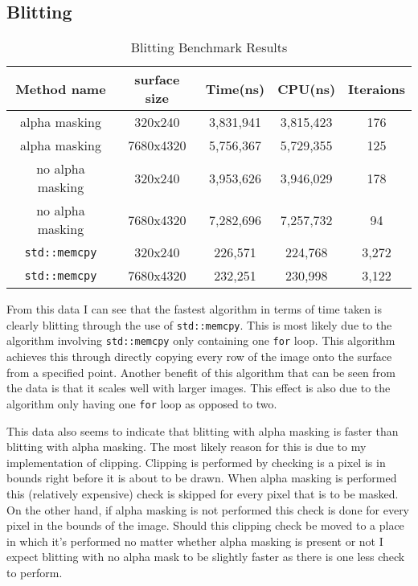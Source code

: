 \documentclass[
	a4paper, %
	10pt, %
]{CSUniSchoolLabReport}
\begin{document}
\subsection{Blitting}
\begin{table}[ht]
	\caption{Blitting Benchmark Results} %
	\centering 
	\begin{tabular}{c c c c c} 
	\hline
	Method name & surface size & Time(ns) & CPU(ns) & Iteraions \\ [0.5ex] 
	\hline
	alpha masking & 320x240 & 3,831,941 & 3,815,423 & 176 \\ 
	alpha masking & 7680x4320 & 5,756,367 & 5,729,355 & 125 \\
	no alpha masking & 320x240 & 3,953,626 & 3,946,029 & 178 \\
	no alpha masking & 7680x4320 & 7,282,696 & 7,257,732 & 94 \\
	\verb|std::memcpy| & 320x240 & 226,571 & 224,768 & 3,272 \\ 
	\verb|std::memcpy| & 7680x4320 & 232,251 & 230,998 & 3,122 \\[1ex] 
	\end{tabular}
\end{table}
\begin{flushleft}
	From this data I can see that the fastest algorithm in terms of time taken is 
	clearly blitting through the use of \verb|std::memcpy|. This is most likely due
	to the algorithm involving \verb|std::memcpy| only containing one \verb|for| loop.
	This algorithm achieves this through directly copying every row of the image onto
	the surface from a specified point. Another benefit of this algorithm that can be seen from 
	the data is that it scales well with larger images. This effect is also due to the algorithm
	only having one \verb|for| loop as opposed to two.
\end{flushleft}
\begin{flushleft}
	This data also seems to indicate that blitting with alpha masking is faster than
	blitting with alpha masking. The most likely reason for this is due to my implementation 
	of clipping. Clipping is performed by checking is a pixel is in bounds right before it
	is about to be drawn. When alpha masking is performed this (relatively expensive) check 
	is skipped for every pixel that is to be masked. On the other hand, if alpha masking is not 
	performed this check is done for every pixel in the bounds of the image. Should this clipping 
	check be moved to a place in which it's performed no matter whether alpha masking is present or not
	I expect blitting with no alpha mask to be slightly faster as there is one less check to perform.
\end{flushleft}
\end{document}
